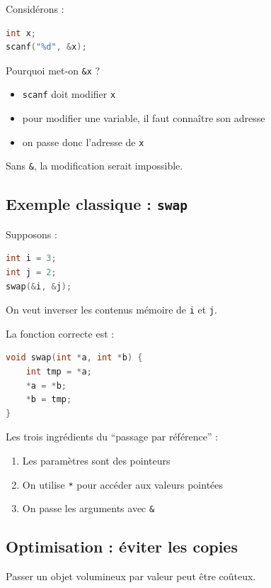 Considérons :

\begin{lstlisting}[language=C]
int x;
scanf("%d", &x);
\end{lstlisting}

Pourquoi met-on \texttt{\&x} ?

\begin{itemize}
    \item \texttt{scanf} doit modifier \texttt{x}
    \item pour modifier une variable, il faut connaître son adresse
    \item on passe donc l’adresse de \texttt{x}
\end{itemize}

Sans \texttt{\&}, la modification serait impossible.

\subsection{Exemple classique : \texttt{swap}}

Supposons :

\begin{lstlisting}[language=C]
int i = 3;
int j = 2;
swap(&i, &j);
\end{lstlisting}

On veut inverser les contenus mémoire de \texttt{i} et \texttt{j}.

La fonction correcte est :

\begin{lstlisting}[language=C]
void swap(int *a, int *b) {
    int tmp = *a;
    *a = *b;
    *b = tmp;
}
\end{lstlisting}

Les trois ingrédients du ``passage par référence'' :

\begin{enumerate}
    \item Les paramètres sont des pointeurs
    \item On utilise \texttt{*} pour accéder aux valeurs pointées
    \item On passe les arguments avec \texttt{\&}
\end{enumerate}

\subsection{Optimisation : éviter les copies}

Passer un objet volumineux par valeur peut être coûteux.

